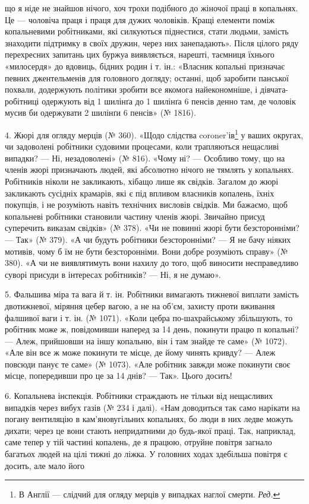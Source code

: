 \parcont{}  %
що я ніде не знайшов нічого, хоч трохи подібного до жіночої
праці в копальнях. Це — чоловіча праця і праця для дужих
чоловіків. Кращі елементи поміж копальневими робітниками,
які силкуються піднестися, стати людьми, замість знаходити підтримку
в своїх дружин, через них занепадають». Після цілого
ряду перехресних запитань цих буржуа виявляється, нарешті,
таємниця їхнього «милосердя» до вдовиць, бідних родин і т. ін.:
«Власник копальні призначає певних джентельменів для головного
догляду; останні, щоб заробити панської похвали, додержують
політики зробити все якомога найекономніше, і дівчата-робітниці
одержують від 1 шилінґа до 1 шилінґа 6 пенсів денно там,
де чоловік мусив би одержувати 2 шилінґи 6 пенсів» (№ 1816).

4. Жюрі для огляду мерців (№ 360). «Щодо слідства coroner’ів\footnote*{
В Англії — слідчий для огляду мерців у випадках наглої смерти. \emph{Ред.}
}
у ваших округах, чи задоволені робітники судовими процесами,
коли трапляються нещасливі випадки? — Ні, незадоволені»
(№ 816). «Чому ні? — Особливо тому, що на членів жюрі призначають
людей, які абсолютно нічого не тямлять у копальнях. Робітників
ніколи не закликають, хібащо лише як свідків. Загалом
до жюрі закликають сусідніх крамарів, які є під впливом власників
копалень, їхніх покупців, і не розуміють навіть технічних
висловів свідків. Ми бажаємо, щоб копальневі робітники становили
частину членів жюрі. Звичайно присуд суперечить виказам
свідків» (№ 378). «Чи не повинні жюрі бути безсторонніми? —
Так» (№ 379). «А чи будуть робітники безсторонніми? — Я не
бачу ніяких мотивів, чому б їм не бути безсторонніми. Вони
добре розуміють справу» (№ 380). «А чи не виявлятимуть вони
нахилу до того, щоб виносити несправедливо суворі присуди в
інтересах робітників? — Ні, я не думаю».

5. Фальшива міра та вага й т. ін. Робітники вимагають тижневої
виплати замість двотижневої, міряння цебер вагою, а не
на об’єм, захисту проти вживання фалшивої ваги і т. ін.
(№ 1071). «Коли цебра по-шахрайському збільшують, то робітник
може ж, повідомивши наперед за 14 день, покинути працю
п копальні? — Алеж, прийшовши на іншу копальню, він і там
знайде те саме» (№ 1072). «Але він все ж може покинути те місце,
де йому чинять кривду? — Алеж повсюди панує те саме» (№ 1073).
«Але робітник завжди може покинути своє місце, попередивши
про це за 14 днів? — Так». Цього досить!

6. Копальнева інспекція. Робітники страждають не тільки
від нещасливих випадків через вибух газів (№ 234 і далі). «Нам
доводиться так само нарікати на погану вентиляцію в кам’яновугільних
копальнях, бо люди в них ледве можуть дихати;
через це вони стають непридатними до будь-якої праці. Так,
наприклад, саме тепер у тій частині копалень, де я працюю,
отруйне повітря загнало багатьох людей на цілі тижні до ліжка.
У головних ходах здебільша повітря є досить, але мало його
\parbreak{}  %
